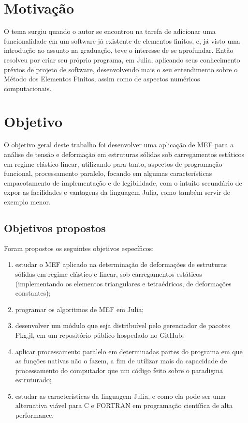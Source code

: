 \section{Motivação}

O tema surgiu quando o autor se encontrou na tarefa de adicionar uma funcionalidade em um software já existente de elementos finitos, e, já visto uma introdução ao assunto na graduação, teve o interesse de se aprofundar. Então resolveu por criar seu próprio programa, em Julia, aplicando seus conhecimento prévios de projeto de software, desenvolvendo mais o seu entendimento sobre o Método dos Elementos Finitos, assim como de aspectos numéricos computacionais.


\section{Objetivo}

O objetivo geral deste trabalho foi desenvolver uma aplicação de MEF para a análise de tensão e deformação em estruturas sólidas sob carregamentos estáticos em regime elástico linear, utilizando para tanto, aspectos de programação funcional, processamento paralelo, focando em algumas características empacotamento de implementação e de legibilidade, com o intuito secundário de expor as facilidades e vantagens da linguagem Julia, como também servir de exemplo menor.

\subsection{Objetivos propostos}

Foram propostos os seguintes objetivos específicos:

\begin{enumerate}
    \item estudar o MEF aplicado na determinação de deformações de estruturas sólidas em regime elástico e linear, sob carregamentos estáticos (implementando os elementos triangulares e tetraédricos, de deformações constantes);
    \item programar os algoritmos de MEF em Julia;
    \item desenvolver um módulo que seja distribuível pelo gerenciador de pacotes Pkg.jl, em um repositório público hospedado no GitHub;
    \item aplicar processamento paralelo em determinadas partes do programa em que as funções nativas não o fazem, a fim de utilizar mais da capacidade de processamento do computador que um código feito sobre o paradigma estruturado;
    \item estudar as características da linguagem Julia, e como ela pode ser uma alternativa viável para C e FORTRAN em programação científica de alta performance.
\end{enumerate}

